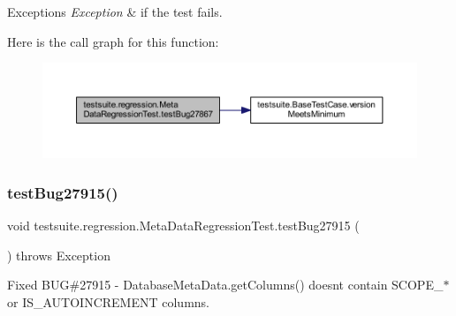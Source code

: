 \begin{DoxyExceptions}{Exceptions}
{\em Exception} & if the test fails. \\
\hline
\end{DoxyExceptions}
Here is the call graph for this function\+:
\nopagebreak
\begin{figure}[H]
\begin{center}
\leavevmode
\includegraphics[width=350pt]{classtestsuite_1_1regression_1_1_meta_data_regression_test_ad4bf6071c2581485e1d8d44e36d385ae_cgraph}
\end{center}
\end{figure}
\mbox{\label{classtestsuite_1_1regression_1_1_meta_data_regression_test_a32361bc11ddd1b2990adfa15697e27ae}} 
\subsubsection{\texorpdfstring{test\+Bug27915()}{testBug27915()}}
{\footnotesize\ttfamily void testsuite.\+regression.\+Meta\+Data\+Regression\+Test.\+test\+Bug27915 (\begin{DoxyParamCaption}{ }\end{DoxyParamCaption}) throws Exception}

Fixed B\+UG\#27915 -\/ Database\+Meta\+Data.\+get\+Columns() doesn\textquotesingle{}t contain S\+C\+O\+P\+E\+\_\+$\ast$ or I\+S\+\_\+\+A\+U\+T\+O\+I\+N\+C\+R\+E\+M\+E\+NT columns.


